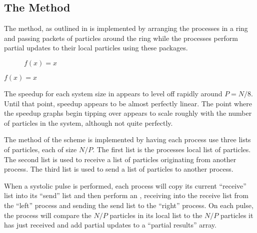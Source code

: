 %
%

\subsection{The \pairoperation{} Method}

The \pairoperation{} method, as outlined in 
is implemented by arranging the processes in a ring and passing
packets of particles around the ring while the processes perform
partial updates to their local particles using these packages.


%

%
%
\begin{figure}[!h]
    
    \caption{
        \vZeroSpeedupCaption
            {\systolicloop{}}
            {\pairoperation{}}
            {$f(x) = x$}
    }
    \label{fig:v0_systolic_pair_operation_speedups}
\end{figure}


\vZeroSpeedupExplanation
    {}
    {\systolicloop{}}
    {\pairoperation{}}
    {$f(x) = x$}

The speedup for each system size in 
appears to level off rapidly around $P = N/8$.
%
Until that point, speedup appears to be almost perfectly linear.
%
The point where the speedup graphs begin tipping over appears to
scale roughly with the number of particles in the system,
although not quite perfectly.


The \pairoperation{} method of the \systolicloop{} scheme is
implemented by having each process use three lists of particles,
each of size $N/P$.
%
The first list is the processes local list of particles.
%
The second list is used to receive a list of particles originating from
another process.
%
The third list is used to send a list of particles to another process.

When a systolic pulse is performed,
each process will copy its current ``receive''
list into its ``send'' list and then perform an \mpisendrecv{}, receiving
into the receive list from the ``left'' process and sending the send list
to the ``right'' process.
%
On each pulse, the process will compare the $N/P$ particles in its
local list to the $N/P$ particles it has just received and
add partial updates to a ``partial results'' array.

